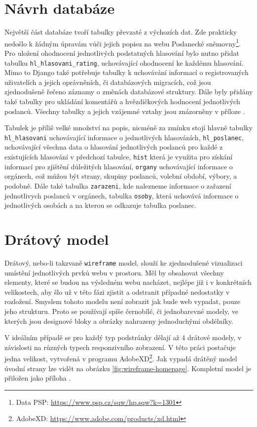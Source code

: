 \section{Návrh databáze}
Největší část databáze tvoří tabulky převzaté z výchozích dat. Zde prakticky nedošlo k žádným úpravám vůči jejich popisu na webu Poslanecké sněmovny\footnote{Data PSP: \url{https://www.psp.cz/sqw/hp.sqw?k=1301}}. Pro uložení ohodnocení jednotlivých podstatných hlasování bylo nutno přidat tabulku \texttt{hl\_hlasovani\_rating}, uchovávající ohodnocení ke každému hlasování. Mimo to Django také potřebuje tabulky k uchovávání informací o registrovaných uživatelích a jejich oprávněních, či databázových migracích, což jsou zjednodušeně řečeno záznamy o změnách databázové struktury. Dále byly přidány také tabulky pro ukládání komentářů a hvězdičkových hodnocení jednotlivých poslanců. Všechny tabulky a jejich vzájemné vztahy jsou znázorněny v příloze .

\par Tabulek je příliš velké množství na popis, nicméně za zmínku stojí hlavně tabulky \texttt{hl\_hlasovani} uchovávající informace o jednotlivých hlasováních, \texttt{hl\_poslanec}, uchovávající všechna data o hlasování jednotlivých poslanců pro každé z existujících hlasování v předchozí tabulce, \texttt{hist} která je využita pro získání informací pro zjištění důležitých hlasování, \texttt{organy} uchovávající informace o orgánech, což můžou být strany, skupiny poslanců, volební období, výbory, a podobně. Dále také tabulka \texttt{zarazeni}, kde nalezneme  informace o zařazení jednotlivych poslanců v orgánech, tabulka \texttt{osoby}, která uchovává informace o jednotlivých osobách a na kterou se odkazuje tabulka poslanec.

\section{Drátový model}
\label{section:wireframe}
Drátový, nebo-li takzvaně \texttt{wireframe} model, slouží ke zjednodušené vizualizaci umístění jednotlivých prvků webu v prostoru. Měl by obsahovat všechny elementy, které se budou na výsledném webu nacházet, nejlépe již i v konkrétních velikostech, aby šlo už v této fázi zjistit a odstranit případné nedostatky v rozložení. Smyslem tohoto modelu není zobrazit jak bude web vypadat, pouze jeho strukturu. Proto se používají spíše černobílé, či jednobarevné modely, ve kterých jsou designové bloky a obrázky nahrazeny jednoduchými obdélníky.
\par V ideálním případě se pro každý typ podstránky dělají až 4 drátové modely, v závislosti na různých typech responzivního zobrazení. V této práci postačuje jedna velikost, vytvořená v programu AdobeXD\footnote{AdobeXD: \url{https://www.adobe.com/products/xd.html}}. Jak vypadá drátěný model úvodní strany lze vidět na obrázku \ref{fig:wireframe-homepage}. Kompletní model je přiložen jako příloha . 

